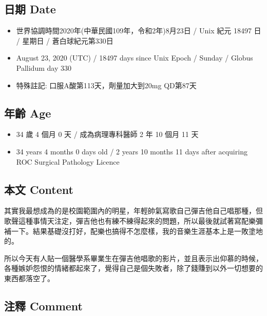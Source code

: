 \documentclass[a5paper, 11pt
]{book}
\providecommand{\tightlist}{%
  \setlength{\itemsep}{0pt}\setlength{\parskip}{0pt}}
\begin{document}
\hypertarget{ux65e5ux671f-date-71}{%
\subsection{日期 Date}\label{ux65e5ux671f-date-71}}

\begin{itemize}
\tightlist
\item
  世界協調時間2020年(中華民國109年，令和2年)8月23日 / Unix 紀元 18497 日
  / 星期日 / 蒼白球紀元第330日
\item
  August 23, 2020 (UTC) / 18497 days since Unix Epoch / Sunday / Globus
  Pallidum day 330
\item
  特殊註記: 口服A酸第113天，劑量加大到20mg QD第87天
\end{itemize}

\hypertarget{ux5e74ux9f61-age-71}{%
\subsection{年齡 Age}\label{ux5e74ux9f61-age-71}}

\begin{itemize}
\tightlist
\item
  34 歲 4 個月 0 天 / 成為病理專科醫師 2 年 10 個月 11 天
\item
  34 years 4 months 0 days old / 2 years 10 months 11 days after
  acquiring ROC Surgical Pathology Licence
\end{itemize}

\hypertarget{ux672cux6587-content-71}{%
\subsection{本文 Content}\label{ux672cux6587-content-71}}

其實我最想成為的是校園範圍內的明星，年輕帥氣寫歌自己彈吉他自己唱那種，但歌聲這種事情天注定，彈吉他也有練不練得起來的問題，所以最後就試著寫配樂彌補一下。結果基礎沒打好，配樂也搞得不怎麼樣，我的音樂生涯基本上是一敗塗地的。

所以今天有人貼一個醫學系畢業生在彈吉他唱歌的影片，並且表示出仰慕的時候，各種嫉妒怨恨的情緒都起來了，覺得自己是個失敗者，除了錢賺到以外一切想要的東西都落空了。

\hypertarget{ux6ce8ux91cb-comment-71}{%
\subsection{注釋 Comment}\label{ux6ce8ux91cb-comment-71}}
\end{document}
